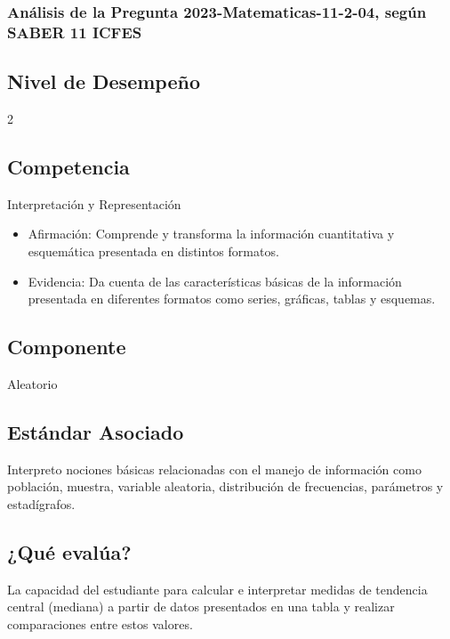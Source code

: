\documentclass[
]{article}
\providecommand{\tightlist}{%
  \setlength{\itemsep}{0pt}\setlength{\parskip}{0pt}}
\begin{document}
\subsubsection{Análisis de la Pregunta 2023-Matematicas-11-2-04, según
SABER 11
ICFES}\label{anuxe1lisis-de-la-pregunta-2023-matematicas-11-2-04-seguxfan-saber-11-icfes}

\subsection{Nivel de Desempeño}\label{nivel-de-desempeuxf1o}

2

\subsection{Competencia}\label{competencia}

Interpretación y Representación

\begin{itemize}
\tightlist
\item
  Afirmación: Comprende y transforma la información cuantitativa y
  esquemática presentada en distintos formatos.
\item
  Evidencia: Da cuenta de las características básicas de la información
  presentada en diferentes formatos como series, gráficas, tablas y
  esquemas.
\end{itemize}

\subsection{Componente}\label{componente}

Aleatorio

\subsection{Estándar Asociado}\label{estuxe1ndar-asociado}

Interpreto nociones básicas relacionadas con el manejo de información
como población, muestra, variable aleatoria, distribución de
frecuencias, parámetros y estadígrafos.

\subsection{¿Qué evalúa?}\label{quuxe9-evaluxfaa}

La capacidad del estudiante para calcular e interpretar medidas de
tendencia central (mediana) a partir de datos presentados en una tabla y
realizar comparaciones entre estos valores.
\end{document}
